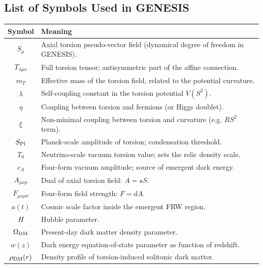 \documentclass{article}
\begin{document}
\subsection {List of Symbols Used in GENESIS}

\begin{table}[h!]
\centering
\renewcommand{\arraystretch}{1.3}
\begin{tabular}{|c|p{11cm}|}
\hline
\textbf{Symbol} & \textbf{Meaning} \\
\hline
$S_\mu$ & Axial torsion pseudo-vector field (dynamical degree of freedom in GENESIS). \\
\hline
$T_{\lambda\mu\nu}$ & Full torsion tensor; antisymmetric part of the affine connection. \\
\hline
$m_T$ & Effective mass of the torsion field, related to the potential curvature. \\
\hline
$\lambda$ & Self-coupling constant in the torsion potential $V(S^2)$. \\
\hline
$\eta$ & Coupling between torsion and fermions (or Higgs doublet). \\
\hline
$\xi$ & Non-minimal coupling between torsion and curvature (e.g. $RS^2$ term). \\
\hline
$S_{\rm Pl}$ & Planck-scale amplitude of torsion; condensation threshold. \\
\hline
$T_0$ & Neutrino-scale vacuum torsion value; sets the relic density scale. \\
\hline
$c_\Lambda$ & Four-form vacuum amplitude; source of emergent dark energy. \\
\hline
$A_{\mu\nu\rho}$ & Dual of axial torsion field: $A = \star S$. \\
\hline
$F_{\mu\nu\rho\sigma}$ & Four-form field strength: $F = dA$. \\
\hline
$a(t)$ & Cosmic scale factor inside the emergent FRW region. \\
\hline
$H$ & Hubble parameter. \\
\hline
$\Omega_{\rm DM}$ & Present-day dark matter density parameter. \\
\hline
$w(z)$ & Dark energy equation-of-state parameter as function of redshift. \\
\hline
$\rho_{\rm DM}(r)$ & Density profile of torsion-induced solitonic dark matter. \\

\end{tabular}
\end{table}
\end{document}
